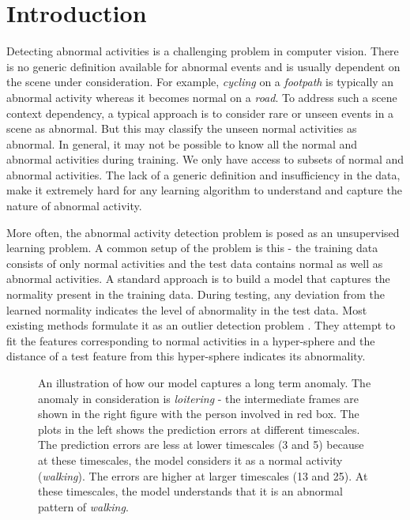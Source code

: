 \documentclass[conference]{IEEEtran}
\begin{document}
\section{Introduction}
\label{sec:intro}

Detecting abnormal activities is a challenging problem in computer vision. There is no generic definition available for abnormal events and is usually dependent on the scene under consideration. For example, \textit{cycling} on a \textit{footpath} is typically an abnormal activity whereas it becomes normal on a \textit{road}. To address such a scene context dependency, a typical approach is to consider rare or unseen events in a scene as abnormal. But this may classify the unseen normal activities as abnormal. In general, it may not be possible to know all the normal and abnormal activities during training. We only have access to subsets of normal and abnormal activities. The lack of a generic definition and insufficiency in the data, make it extremely hard for any learning algorithm to understand and capture the nature of abnormal activity. 

More often, the abnormal activity detection problem is posed as an unsupervised learning problem. A common setup of the problem is this - the training data consists of only normal activities and the test data contains normal as well as abnormal activities. A standard approach is to build a model that captures the normality present in the training data. During testing, any deviation from the learned normality indicates the level of abnormality in the test data. Most existing methods formulate it as an outlier detection problem \cite{hasan2016,xu2015,tran2017,TSC-RNN,gan2017}. They attempt to fit the features corresponding to normal activities in a hyper-sphere and the distance of a test feature from this hyper-sphere indicates its abnormality. 

\begin{figure*}
    \centering
    \caption{An illustration of how our model captures a long term anomaly. The anomaly in consideration is \textit{loitering} - the intermediate frames are shown in the right figure with the person involved in red box. The plots in the left shows the prediction errors at different timescales. The prediction errors are less at lower timescales (3 and 5) because at these timescales, the model considers it as a normal activity (\textit{walking}). The errors are higher at larger timescales (13 and 25). At these timescales, the model understands that it is an abnormal pattern of \textit{walking}.}
    \label{fig:loitering_ex}
\end{figure*}
\end{document}
